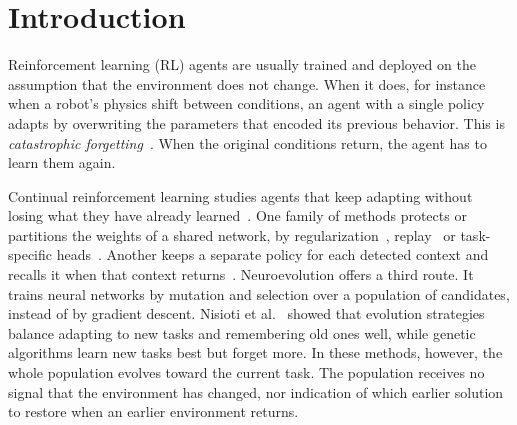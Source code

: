 \section{Introduction}

Reinforcement learning (RL) agents are usually trained and deployed on the assumption that the environment does not change. When it does, for instance when a robot's physics shift between conditions, an agent with a single policy adapts by overwriting the parameters that encoded its previous behavior. This is \textit{catastrophic forgetting}~\cite{mccloskey1989catastrophic}. When the original conditions return, the agent has to learn them again.

Continual reinforcement learning studies agents that keep adapting without losing what they have already learned~\cite{khetarpal2022towards}. One family of methods protects or partitions the weights of a shared network, by regularization~\cite{kirkpatrick2017overcoming}, replay~\cite{rolnick2019experience} or task-specific heads~\cite{kessler2022same}. Another keeps a separate policy for each detected context and recalls it when that context returns~\cite{dasilva2006dealing,alegre2021minimum,dick2024statistical}. Neuroevolution offers a third route. It trains neural networks by mutation and selection over a population of candidates, instead of by gradient descent. Nisioti et al.~\cite{nisioti2026continual} showed that evolution strategies balance adapting to new tasks and remembering old ones well, while genetic algorithms learn new tasks best but forget more. In these methods, however, the whole population evolves toward the current task. The population receives no signal that the environment has changed, nor indication of which earlier solution to restore when an earlier environment returns.

